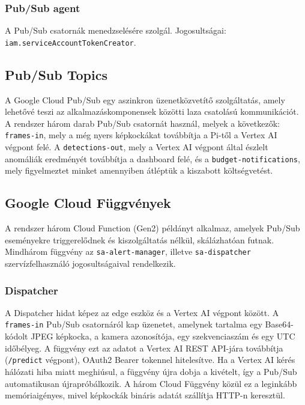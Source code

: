             \subsubsection{Pub/Sub agent}
            \begin{sloppypar}
            A Pub/Sub csatornák menedzselésére szolgál. Jogosultságai: \texttt{iam.serviceAccountTokenCreator}.
            \end{sloppypar}

        \subsection{Pub/Sub Topics}
        A Google Cloud Pub/Sub egy aszinkron üzenetközvetítő szolgáltatás, amely lehetővé teszi az alkalmazáskomponensek közötti laza csatolású kommunikációt\cite{pubsub}.
        A rendszer három darab Pub/Sub csatornát használ, melyek a következők: \texttt{frames-in}, mely a még nyers képkockákat továbbítja a Pi-től a Vertex AI végpont felé.
        A \texttt{detections-out}, mely a Vertex AI végpont által észlelt anomáliák eredményét továbbítja a dashboard felé, és a \texttt{budget-notifications}, mely figyelmeztet minket
        amennyiben átléptük a kiszabott költségvetést.
            
                

        \subsection{Google Cloud Függvények}
        A rendszer három Cloud Function (Gen2) példányt alkalmaz, amelyek Pub/Sub eseményekre triggerelődnek és kiszolgáltatás nélkül,
        skálázhatóan futnak. Mindhárom függvény az \texttt{sa-alert-manager}, illetve \texttt{sa-dispatcher} szervízfelhasználó jogosultságaival rendelkezik.

            \subsubsection{Dispatcher}
            A Dispatcher hidat képez az edge eszköz és a Vertex AI végpont között. A \texttt{frames-in} Pub/Sub csatornáról kap üzenetet,
            amelynek tartalma egy Base64-kódolt JPEG képkocka, a kamera azonosítója, egy szekvenciaszám és egy UTC időbélyeg.
            A függvény ezt az adatot a Vertex AI REST API-jára továbbítja (\texttt{/predict} végpont), OAuth2 Bearer tokennel hitelesítve.
            Ha a Vertex AI kérés hálózati hiba miatt meghiúsul, a függvény újra dobja a kivételt, így a Pub/Sub automatikusan újrapróbálkozik.
            A három Cloud Függvény közül ez a leginkább memóriaigényes, mivel képkockák bináris adatát szállítja HTTP-n keresztül.

